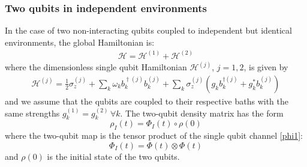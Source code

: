 \documentclass[ pra,a4paper,aps,twocolumn,superscriptaddress]{revtex4-1}
\def\tc#1{{\color{black}#1}}
\begin{document}
\subsubsection{Two qubits in independent environments}
%
In the case of two non-interacting qubits coupled to independent but identical environments, the global Hamiltonian is:
 \begin{align}
 \mathcal{H}=\mathcal{H}^{(1)}+\mathcal{H}^{(2)}
 \end{align}
 where the \tc{dimensionless }single qubit Hamiltonian $\mathcal{H}^{(j)}$, $j=1,2$, is given by 
 \begin{align}
\!\!\! \mathcal{H}^{(j)}\! = \! \frac12 \sigma_z^{(j)} \!+ \! \sum_k \! \omega_k b_k^{\!\dagger (j)}b_k^{\!(j)} \!\! +\! \sum_k \! \sigma_z^{(j)} \!\! \left(g_k b_k^{\dagger (j)} \!\! + \!\! g_k^{*}b_k^{(j)}\! \right)
\end{align}
and we assume that the qubits are coupled to their respective baths with the same strengths $g_k^{(1)}=g_k^{(2)}\, \forall k$. 
The two-qubit density matrix has the form
\begin{equation}
\rho_I(t)=\Phi_I(t)\circ\rho(0)
\end{equation}
where the two-qubit map is the tensor product of the single qubit channel \eqref{phi1}:
\begin{equation}
\Phi_I(t)=\Phi(t)\otimes\Phi(t)
\end{equation}
and $\rho(0)$ is  the initial state of the two qubits.
\end{document}
